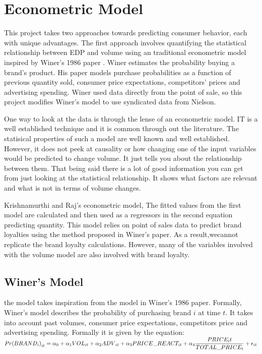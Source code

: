 \documentclass{article}
\begin{document}
\section{Econometric Model}

This project takes two approaches towards predicting consumer behavior, each with unique advantages. The first approach involves quantifying the statistical relationship between EDP and volume using an traditional econometric model inspired by Winer's 1986 paper \cite{winer}. Winer estimates the probability buying a brand's product. His paper models purchase probabilities as a function of previous quantity sold, consumer price expectations, competitors' prices and advertising spending. Winer used data directly from the point of sale, so this project modifies Winer's model to use syndicated data from Nielson.

One way to look at the data is through the lense of an econometric model. IT is a well established technique and it is common through out the literature. The statisical properties of such a model are well known and well established. However, it does not peek at causality or how changing one of the input variables would be predicted to change volume. It just tells you about the relationship between them. That being said there is a lot of good information you can get from just looking at the statistical relationship. It shows what factors are relevant and what is not in terms of volume changes.

Krishnamurthi and Raj's econometric model, The fitted values from the first model are calculated and then used as a regressors in the second equation predicting quantity. This model relies on point of sales data to predict brand loyalties using the method proposed in Winer's paper. As a result,wecannot replicate the brand loyalty calculations. However, many of the variables involved with the volume model are also involved with brand loyalty.

\subsection{Winer's Model}
the model takes inspiration from the model in Winer's 1986 paper. Formally, Winer's model describes the probability of purchasing brand $i$ at time $t$. It takes into account past volumes,  consumer price expectations, competitors price and advertising spending. Formally it is given by the equation: \\

$ {Pr(BRAND_i)}_{it} = \alpha_0 + \alpha_1 {VOL}_{it} + \alpha_2 {ADV}_{it} +  \alpha_3 PRICE\_REACT_{it}  \medskip + \alpha_4 \dfrac{PRICE_it}{TOTAL\_PRICE_{t}} + \epsilon_{it}$\\
\end{document}
